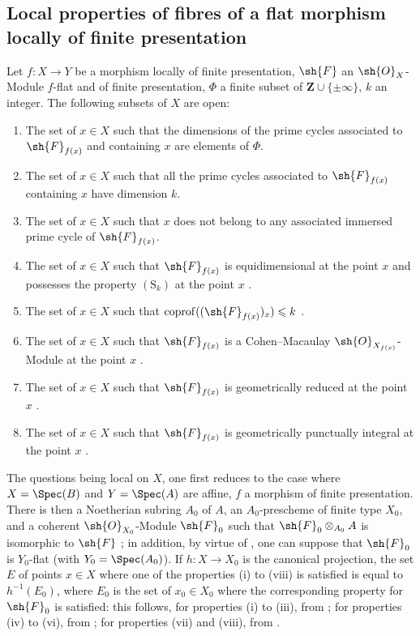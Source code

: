 \subsection{Local properties of fibres of a flat morphism locally of finite presentation}
\label{subsection:IV.12.1}

\begin{theorem}[12.1.1]
\label{IV.12.1.1}
Let $f:X\to Y$ be a morphism locally of finite presentation, $\sh{F}$ an $\sh{O}_X$-Module $f$-flat and of finite presentation, $\Phi$ a finite subset of $\mathbf{Z}\cup\{\pm\infty\}$, $k$ an integer.
The following subsets of $X$ are open:
\begin{enumerate}[label=(\roman*)]
  \item The set of $x\in X$ such that the dimensions of the prime cycles associated to $\sh{F}_{f(x)}$ and containing $x$ are elements of $\Phi$.
  \item The set of $x\in X$ such that all the prime cycles associated to $\sh{F}_{f(x)}$ containing $x$ have dimension $k$.
  \item The set of $x\in X$ such that $x$ does not belong to any associated immersed prime cycle of $\sh{F}_{f(x)}$.
  \item The set of $x\in X$ such that $\sh{F}_{f(x)}$ is equidimensional at the point $x$ and possesses the property $(\mathrm{S}_k)$ at the point $x$ .
  \item The set of $x\in X$ such that $\operatorname{coprof}((\sh{F}_{f(x)})_x)\leqslant k$ .
  \item The set of $x\in X$ such that $\sh{F}_{f(x)}$ is a Cohen--Macaulay $\sh{O}_{X_{f(x)}}$-Module at the point $x$ .
  \item The set of $x\in X$ such that $\sh{F}_{f(x)}$ is geometrically reduced at the point $x$ .
  \item The set of $x\in X$ such that $\sh{F}_{f(x)}$ is geometrically punctually integral at the point $x$ .
\end{enumerate}

The questions being local on $X$, one first reduces to the case where $X=\Spec(B)$ and $Y=\Spec(A)$ are affine, $f$ a morphism of finite presentation.
There is then a Noetherian subring $A_0$ of $A$, an $A_0$-prescheme of finite type $X_0$, and a coherent $\sh{O}_{X_0}$-Module $\sh{F}_0$ such that $\sh{F}_0\otimes_{A_0}A$ is isomorphic to $\sh{F}$ ; in addition, by virtue of , one can suppose that $\sh{F}_0$ is $Y_0$-flat (with $Y_0=\Spec(A_0)$).
If $h:X\to X_0$ is the canonical projection, the set $E$ of points $x\in X$ where one of the properties (i) to (viii) is satisfied is equal to $h^{-1}(E_0)$, where $E_0$ is the set of $x_0\in X_0$ where the corresponding property for $\sh{F}_0$ is satisfied: this follows, for properties (i) to (iii), from ; for properties (iv) to (vi), from ; for properties (vii) and (viii), from .
\end{theorem}

